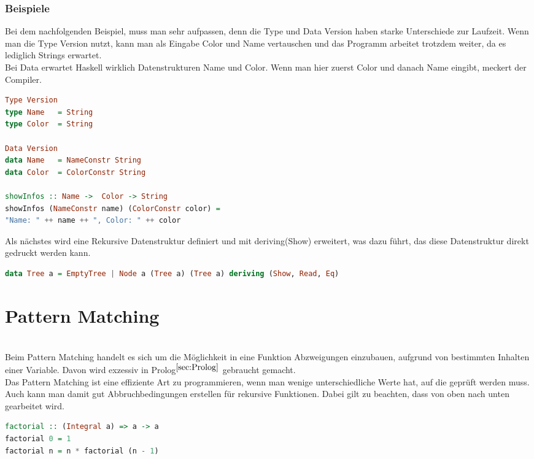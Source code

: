 \subsubsection{Beispiele}
Bei dem nachfolgenden Beispiel, muss man sehr aufpassen, denn die Type und Data Version haben starke Unterschiede zur Laufzeit. Wenn man die Type Version nutzt, kann man als Eingabe Color und Name vertauschen und das Programm arbeitet trotzdem weiter, da es lediglich Strings erwartet. \\
Bei Data erwartet Haskell wirklich Datenstrukturen Name und Color. Wenn man hier zuerst Color und danach Name eingibt, meckert der Compiler. 

\begin{lstlisting}[language=Haskell]  
Type Version
type Name   = String
type Color  = String

Data Version
data Name   = NameConstr String
data Color  = ColorConstr String

showInfos :: Name ->  Color -> String
showInfos (NameConstr name) (ColorConstr color) =
"Name: " ++ name ++ ", Color: " ++ color
\end{lstlisting}\qquad\newline
Als nächstes wird eine Rekursive Datenstruktur definiert und mit deriving(Show) erweitert, was dazu führt, das diese Datenstruktur direkt gedruckt werden kann. 
\begin{lstlisting}[language=Haskell]  
data Tree a = EmptyTree | Node a (Tree a) (Tree a) deriving (Show, Read, Eq)  
\end{lstlisting}
\section{Pattern Matching}\label{sec:hpm}\qquad\\
Beim Pattern Matching handelt es sich um die Möglichkeit in eine Funktion Abzweigungen einzubauen, aufgrund von bestimmten Inhalten einer Variable. Davon wird exzessiv in Prolog$^{\ref{sec:Prolog}}$ gebraucht gemacht. \\
Das Pattern Matching ist eine effiziente Art zu programmieren, wenn man wenige unterschiedliche Werte hat, auf die geprüft werden muss. Auch kann man damit gut Abbruchbedingungen erstellen für rekursive Funktionen. Dabei gilt zu beachten, dass von oben nach unten gearbeitet wird. 
\begin{lstlisting}[language=Haskell]
factorial :: (Integral a) => a -> a  
factorial 0 = 1  
factorial n = n * factorial (n - 1)  
\end{lstlisting}

